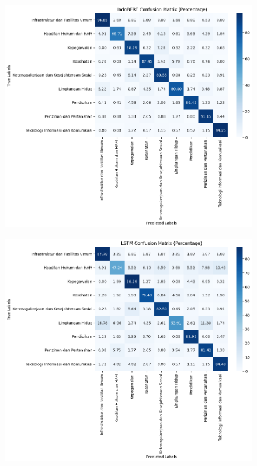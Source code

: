 \documentclass[12pt,a4paper]{article}
\begin{document}
\begin{adjustwidth}
    \begin{figure}
    \centering
    \begin{minipage}{0.3\textwidth}
        \centering
        \includegraphics[width=\linewidth]{Image/cm_indobert.png}
        \label{fig:indobert}
    \end{minipage} \hfill
    \begin{minipage}{0.3\textwidth}
        \centering
        \includegraphics[width=\linewidth]{Image/cm_lstm.png}

\end{minipage}
\end{figure}
\end{adjustwidth}
\end{document}
